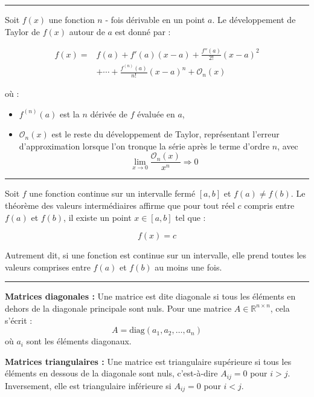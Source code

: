 \hrule
\begin{f}
 
Soit \( f(x) \) une fonction \( n \) - fois dérivable en un point \( a \). Le développement de Taylor de \( f(x) \) autour de \( a \) est donné par :

\begin{align*}
 f(x) =& f(a) + f'(a)(x - a) + \frac{f''(a)}{2!}(x - a)^2 \\
 &+ \cdots + \frac{f^{(n)}(a)}{n!}(x - a)^n + \mathcal{O}_n(x)
\end{align*}


où :
\begin{itemize}
    \item \( f^{(n)}(a) \) est la \( n \)\ieme{} dérivée de \( f \) évaluée en \( a \),
    \item \( \mathcal{O}_n(x) \) est le reste du développement de Taylor, représentant l'erreur d'approximation lorsque l'on tronque la série après le terme d'ordre \( n \), avec 
    \[
    \lim_{x\rightarrow 0}\frac{\mathcal{O}_n(x) }{x^n}\Rightarrow 0
    \]
\end{itemize}
\end{f}
\hrule
\begin{f} 

Soit \( f \) une fonction continue sur un intervalle fermé \([a, b]\) et \( f(a) \neq f(b) \). Le théorème des valeurs intermédiaires affirme que pour tout réel \( c \) compris entre \( f(a) \) et \( f(b) \), il existe un point \( x \in [a, b] \) tel que :

\[
f(x) = c
\]

Autrement dit, si une fonction est continue sur un intervalle, elle prend toutes les valeurs comprises entre \( f(a) \) et \( f(b) \) au moins une fois.
\end{f}
\hrule
\begin{f}
  
\textbf{Matrices diagonales :}
Une matrice est dite diagonale si tous les éléments en dehors de la diagonale principale sont nuls. Pour une matrice \( A \in \mathbb{R}^{n \times n} \), cela s'écrit :
\[
A = \text{diag}(a_1, a_2, \dots, a_n)
\]
où \( a_i \) sont les éléments diagonaux.

\textbf{Matrices triangulaires :}
Une matrice est triangulaire supérieure si tous les éléments en dessous de la diagonale sont nuls, c'est-à-dire \( A_{ij} = 0 \) pour \( i > j \). Inversement, elle est triangulaire inférieure si \( A_{ij} = 0 \) pour \( i < j \).
\end{f}
